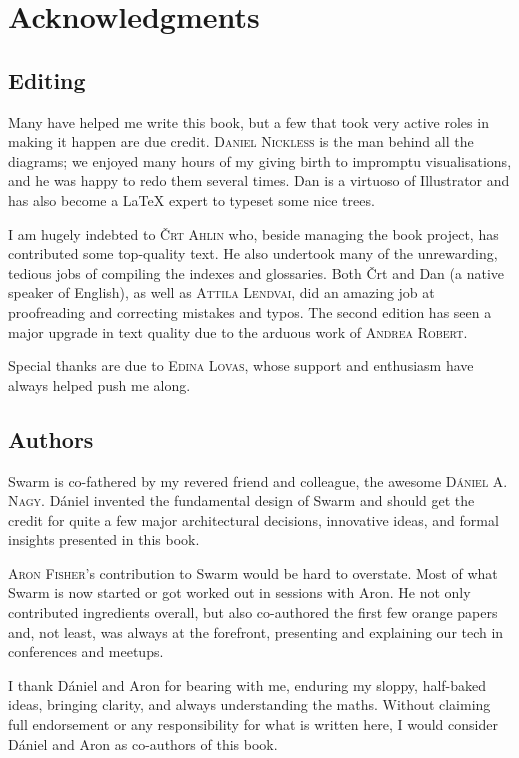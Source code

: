 \newcommand{\person}[1]{{\scshape #1}}
\chapter{Acknowledgments \statusgreen}

\section*{Editing}

Many have helped me write this book, but a few that took very active roles in making it happen are due credit. \person{Daniel Nickless} is the man behind all the diagrams; we enjoyed many hours of my giving birth to impromptu visualisations, and he was happy to redo them several times. Dan is a virtuoso of Illustrator and has also become a LaTeX expert to typeset some nice trees. 

I am hugely indebted to \person{Črt Ahlin} who, beside managing the book project, has contributed some top-quality text.
He also undertook many of the unrewarding, tedious jobs of compiling the indexes and glossaries. Both Črt and Dan (a native speaker of English), as well as \person{Attila Lendvai}, did an amazing job at proofreading and correcting mistakes and typos.
The second edition has seen a major upgrade in text quality due to the arduous work of \person{Andrea Robert}.

Special thanks are due to \person{Edina Lovas}, whose support and enthusiasm have always helped push me along. 

\section*{Authors}

Swarm is co-fathered by my revered friend and colleague, the awesome \person{D{\'a}niel A. Nagy}.  D{\'a}niel invented the fundamental design of Swarm and should get the credit for quite a few major architectural decisions, innovative ideas, and formal insights presented in this book. 

\person{Aron Fisher}'s contribution to Swarm would be hard to overstate. Most of what Swarm is now started or got worked out in sessions with Aron.  He not only contributed ingredients overall, but also co-authored the first few orange papers and, not least, was always at the forefront, presenting and explaining our tech in conferences and meetups.

I thank D{\'a}niel and Aron for bearing with me, enduring my sloppy, half-baked ideas, bringing clarity, and always understanding the maths.
Without claiming full endorsement or any responsibility for what is written here,
I would consider D{\'a}niel and Aron as co-authors of this book.

